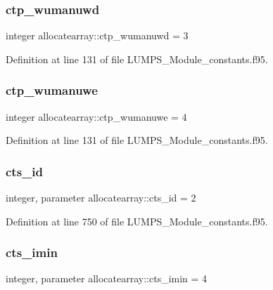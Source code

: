 \subsubsection{\texorpdfstring{ctp\+\_\+wumanuwd}{ctp\_wumanuwd}}
{\footnotesize\ttfamily integer allocatearray\+::ctp\+\_\+wumanuwd = 3}



Definition at line 131 of file L\+U\+M\+P\+S\+\_\+\+Module\+\_\+constants.\+f95.

\mbox{\label{namespaceallocatearray_ad3747ba618ea8936638fd9932176d53b}} 
\subsubsection{\texorpdfstring{ctp\+\_\+wumanuwe}{ctp\_wumanuwe}}
{\footnotesize\ttfamily integer allocatearray\+::ctp\+\_\+wumanuwe = 4}



Definition at line 131 of file L\+U\+M\+P\+S\+\_\+\+Module\+\_\+constants.\+f95.

\mbox{\label{namespaceallocatearray_a6285a744db8c15d81b15f57a83d1f8ca}} 
\subsubsection{\texorpdfstring{cts\+\_\+id}{cts\_id}}
{\footnotesize\ttfamily integer, parameter allocatearray\+::cts\+\_\+id = 2}



Definition at line 750 of file L\+U\+M\+P\+S\+\_\+\+Module\+\_\+constants.\+f95.

\mbox{\label{namespaceallocatearray_a99b48eb99410f19ee1b4a36b352375d4}} 
\subsubsection{\texorpdfstring{cts\+\_\+imin}{cts\_imin}}
{\footnotesize\ttfamily integer, parameter allocatearray\+::cts\+\_\+imin = 4}



